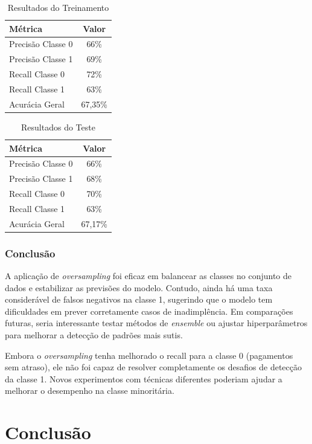 \documentclass{abntpuc}
\begin{document}
\begin{table}[H]
\centering
\begin{tabular}{|l|c|}
\hline
Métrica & Valor \\
\hline
Precisão Classe 0 & 66\% \\
Precisão Classe 1 & 69\% \\
Recall Classe 0 & 72\% \\
Recall Classe 1 & 63\% \\
Acurácia Geral & 67,35\% \\
\hline
\end{tabular}
\caption{Resultados do Treinamento}
\label{tab:resultados_treinamento}
\end{table}

\begin{table}[H]
\centering
\begin{tabular}{|l|c|}
\hline
Métrica & Valor \\
\hline
Precisão Classe 0 & 66\% \\
Precisão Classe 1 & 68\% \\
Recall Classe 0 & 70\% \\
Recall Classe 1 & 63\% \\
Acurácia Geral & 67,17\% \\
\hline
\end{tabular}
\caption{Resultados do Teste}
\label{tab:resultados}
\end{table}

\subsection*{\centering\large\textbf{Conclusão}}
A aplicação de \textit{oversampling} foi eficaz em balancear as classes no conjunto de dados e estabilizar as previsões do modelo. Contudo, ainda há uma taxa considerável de falsos negativos na classe 1, sugerindo que o modelo tem dificuldades em prever corretamente casos de inadimplência. Em comparações futuras, seria interessante testar métodos de \textit{ensemble} ou ajustar hiperparâmetros para melhorar a detecção de padrões mais sutis.

Embora o \textit{oversampling} tenha melhorado o recall para a classe 0 (pagamentos sem atraso), ele não foi capaz de resolver completamente os desafios de detecção da classe 1. Novos experimentos com técnicas diferentes poderiam ajudar a melhorar o desempenho na classe minoritária.

\chapter{Conclusão}
\end{document}
